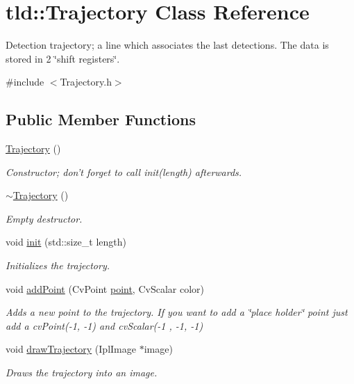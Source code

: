 \hypertarget{classtld_1_1Trajectory}{\section{tld\-:\-:Trajectory Class Reference}
\label{classtld_1_1Trajectory}
}


Detection trajectory; a line which associates the last detections. The data is stored in 2 \char`\"{}shift registers\char`\"{}.  




{\ttfamily \#include $<$Trajectory.\-h$>$}

\subsection*{Public Member Functions}
\begin{DoxyCompactItemize}
\item 
\hyperlink{classtld_1_1Trajectory_ab6baa664e2ea39e5ec0075f525a466ba}{Trajectory} ()
\begin{DoxyCompactList}\small\item\em Constructor; don't forget to call init(length) afterwards. \end{DoxyCompactList}\item 
\hyperlink{classtld_1_1Trajectory_add295e2524012793dd3040fe098ddf65}{$\sim$\-Trajectory} ()
\begin{DoxyCompactList}\small\item\em Empty destructor. \end{DoxyCompactList}\item 
void \hyperlink{classtld_1_1Trajectory_a635927cb2bca22f884ddc00a0e18b6d7}{init} (std\-::size\-\_\-t length)
\begin{DoxyCompactList}\small\item\em Initializes the trajectory. \end{DoxyCompactList}\item 
void \hyperlink{classtld_1_1Trajectory_a28a92000e31f71ce0831d72b068ae97b}{add\-Point} (Cv\-Point \hyperlink{namespacetld_a680868c3e5a47352c5353897519636d4}{point}, Cv\-Scalar color)
\begin{DoxyCompactList}\small\item\em Adds a new point to the trajectory. If you want to add a \char`\"{}place holder\char`\"{} point just add a cv\-Point(-\/1, -\/1) and cv\-Scalar(-\/1 , -\/1, -\/1) \end{DoxyCompactList}\item 
void \hyperlink{classtld_1_1Trajectory_af8a0ffc5eb86050e0d26c766e4b2098d}{draw\-Trajectory} (Ipl\-Image $\ast$image)
\begin{DoxyCompactList}\small\item\em Draws the trajectory into an image. \end{DoxyCompactList}\end{DoxyCompactItemize}
